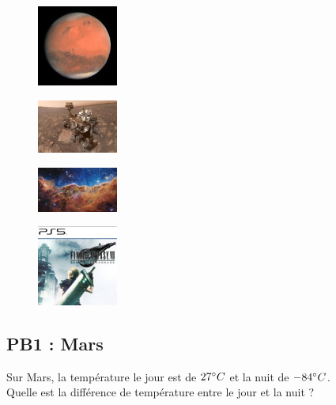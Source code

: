\begin{multicols}{4}
\begin{figure}[H]
  \centering
  \includegraphics[width=100px]{4x2-nombres-relatifs/ex4.jpg}
\end{figure}

\begin{figure}[H]
  \centering
  \includegraphics[width=100px]{4x2-nombres-relatifs/ex5.jpg}
\end{figure}

\begin{figure}[H]
  \centering
  \includegraphics[width=100px]{4x2-nombres-relatifs/ex6.jpg}
\end{figure}

\begin{figure}[H]
  \centering
  \includegraphics[width=100px]{4x2-nombres-relatifs/ex2.jpg}
\end{figure}
\end{multicols}

\vspace{1cm}

\subsection*{PB1 : Mars} 

Sur Mars, la température le jour est de $27\degree C$ et la nuit de $-84\degree C$.\\

Quelle est la différence de température entre le jour et la nuit ?\\

